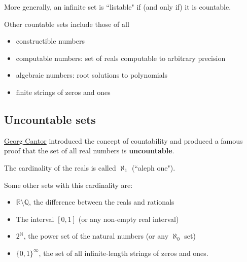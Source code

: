 \documentclass{article}[12pt]
\newcommand{\N}{\mathbb{N}}
\newcommand{\Q}{\mathbb{Q}}
\newcommand{\R}{\mathbb{R}}
\begin{document}
        More generally, an infinite set is ``listable" if (and only if) it is countable.
        
        Other countable sets include those of all
        \begin{itemize}
            \item
            constructible numbers
            
            \item
            computable numbers: set of reals computable to arbitrary precision
            
            \item
            algebraic numbers: root solutions to polynomials
            
            \item
            finite strings of zeros and ones
            
        \end{itemize}
            
        
        
    \subsection{Uncountable sets}
    
        \href{https://www.youtube.com/watch?v=elvOZm0d4H0}{Georg Cantor} introduced the concept of countability and produced a famous proof that the set of all real numbers is \textbf{uncountable}.
        
        The cardinality of the reals is called $\aleph_1$ (``aleph one").
        
        Some other sets with this cardinality are:
        
        \begin{itemize}
            \item $\R \setminus \Q$, the difference between the reals and rationals
            
            \item
            The interval $[0, 1]$ (or any non-empty real interval)
            
            \item
            $2^{\N}$, the power set of the natural numbers (or any $\aleph_0$ set)
            
            \item
            $\{0, 1\}^{\infty}$, the set of all infinite-length strings of zeros and ones.
        \end{itemize}
        
\end{document}
